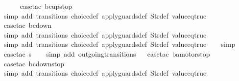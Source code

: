\begin{isabellebody}
\ \ \ \ \isamarkupfalse%
\ {\isacharparenleft}case{\isacharunderscore}tac\ {\isachardoublequoteopen}bc{\isacharequal}up{}{}stop{\isachardoublequoteclose}{\isacharparenright}\isanewline
\ \ \ \ \ \isamarkupfalse%
\ {\isacharparenleft}simp\ add{\isacharcolon}\ transitions\ choice{\isacharunderscore}def\ apply{\isacharunderscore}guards{\isacharunderscore}def\ Str{\isacharunderscore}def\ value{\isacharunderscore}eq{\isacharunderscore}true{\isacharparenright}\isanewline
\ \ \ \ \isamarkupfalse%
\ {\isacharparenleft}case{\isacharunderscore}tac\ {\isachardoublequoteopen}bc{\isacharequal}down{}{}{\isachardoublequoteclose}{\isacharparenright}\isanewline
\ \ \ \ \ \isamarkupfalse%
\ {\isacharparenleft}simp\ add{\isacharcolon}\ transitions\ choice{\isacharunderscore}def\ apply{\isacharunderscore}guards{\isacharunderscore}def\ Str{\isacharunderscore}def\ value{\isacharunderscore}eq{\isacharunderscore}true{\isacharparenright}\isanewline
\ \ \ \ \isamarkupfalse%
\ {\isacharparenleft}simp\ add{\isacharcolon}\ transitions\ choice{\isacharunderscore}def\ apply{\isacharunderscore}guards{\isacharunderscore}def\ Str{\isacharunderscore}def\ value{\isacharunderscore}eq{\isacharunderscore}true{\isacharparenright}\isanewline
\ \ \isamarkupfalse%
\ simp\isanewline
\isanewline
\ \ \isamarkupfalse%
\ {\isacharparenleft}case{\isacharunderscore}tac\ {\isachardoublequoteopen}s{\isacharequal}{}{\isachardoublequoteclose}{\isacharparenright}\isanewline
\ \ \isamarkupfalse%
\ {\isacharparenleft}simp\ add{\isacharcolon}\ outgoing{\isacharunderscore}transitions{\isacharunderscore}{}{\isacharparenright}\isanewline
\ \isamarkupfalse%
\ {\isacharparenleft}case{\isacharunderscore}tac\ {\isachardoublequoteopen}ba{\isacharequal}motorstop{}{\isachardoublequoteclose}{\isacharparenright}\isanewline
\ \ \ \ \isamarkupfalse%
\ {\isacharparenleft}case{\isacharunderscore}tac\ {\isachardoublequoteopen}bc{\isacharequal}down{}{}stop{\isachardoublequoteclose}{\isacharparenright}\isanewline
\ \ \ \ \ \isamarkupfalse%
\ {\isacharparenleft}simp\ add{\isacharcolon}\ transitions\ choice{\isacharunderscore}def\ apply{\isacharunderscore}guards{\isacharunderscore}def\ Str{\isacharunderscore}def\ value{\isacharunderscore}eq{\isacharunderscore}true{\isacharparenright}\isanewline
\ \ \ \ \isamarkupfalse%

\end{isabellebody}
